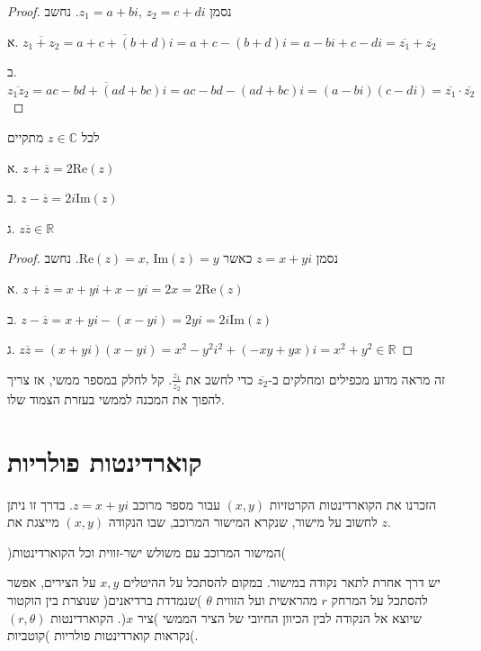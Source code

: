 \documentclass[
  hebrew,
  12pt,
  a4paper,
  oneside]{book}
\theoremstyle{definition}
\theoremstyle{remark}
\theoremstyle{plain}
\theoremstyle{remark}
\begin{document}
\begin{proof}
נסמן \(z_{1}=a+bi,\,z_{2}=c+di\). נחשב

א.
\(\overline{z_{1}+z_{2}}=\overline{a+c+(b+d)i}=a+c-(b+d)i=a-bi+c-di=\overline{z_{1}}+\overline{z_{2}}\)

ב.
\(\overline{z_{1}z_{2}}=\overline{ac-bd+(ad+bc)i}=ac-bd-(ad+bc)i=(a-bi)(c-di)=\overline{z_{1}}\cdot\overline{z_{2}}\)
\end{proof}

\begin{proposition}

לכל \(z\in\mathbb{C}\) מתקיים

א. \(z+\overline{z}=2\text{{Re}}(z)\)

ב. \(z-\overline{z}=2i\text{{Im}}(z)\)

ג. \(z\overline{z}\in\mathbb{R}\)

\end{proposition}

\begin{proof}
נסמן \(z=x+yi\) כאשר \(\text{{Re}}(z)=x,\,\text{{Im}}(z)=y\). נחשב

א. \(z+\overline{z}=x+yi+x-yi=2x=2\text{{Re}}(z)\)

ב. \(z-\overline{z}=x+yi-(x-yi)=2yi=2i\text{{Im}}(z)\)

ג.
\(z\overline{z}=(x+yi)(x-yi)=x^{2}-y^{2}i^{2}+(-xy+yx)i=x^{2}+y^{2}\in\mathbb{R}\)
\end{proof}

זה מראה מדוע מכפילים ומחלקים ב-\(\overline{z_{2}}\) כדי לחשב את
\(\frac{z_{1}}{z_{2}}\). קל לחלק במספר ממשי, אז צריך להפוך את המכנה
לממשי בעזרת הצמוד שלו.

\section{קוארדינטות
פולריות}\label{ux5e7ux5d5ux5d0ux5e8ux5d3ux5d9ux5e0ux5d8ux5d5ux5ea-ux5e4ux5d5ux5dcux5e8ux5d9ux5d5ux5ea}

הזכרנו את הקוארדינטות הקרטזיות \((x,y)\) עבור מספר מרוכב \(z=x+yi\).
בדרך זו ניתן לחשוב על מישור, שנקרא המישור המרוכב, שבו הנקודה \((x,y)\)
מייצגת את \(z\).

)המישור המרוכב עם משולש ישר-זווית וכל הקוארדינטות(

יש דרך אחרת לתאר נקודה במישור. במקום להסתכל על ההיטלים \(x,y\) על
הצירים, אפשר להסתכל על המרחק \(r\) מהראשית ועל הזווית \(\theta\) )שנמדדת
ברדיאנים( שנוצרת בין הוקטור שיוצא אל הנקודה לבין הכיוון החיובי של הציר
הממשי )ציר \(x\)(. הקוארדינטות \((r,\theta)\) נקראות קוארדינטות פולריות
)קוטביות(.
\end{document}
